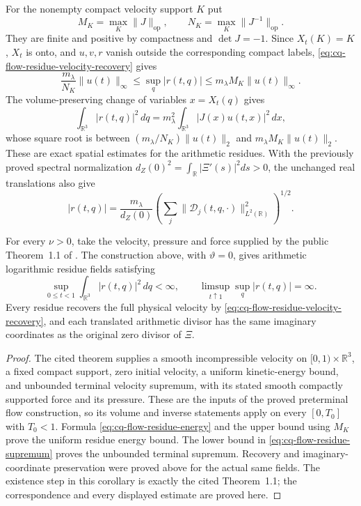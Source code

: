 For the nonempty compact velocity support $K$ put
\[
 M_K=\max_K\|J\|_{\mathrm{op}},\qquad
 N_K=\max_K\|J^{-1}\|_{\mathrm{op}}.
\]
They are finite and positive by compactness and $\det J=-1$.
Since $X_t(K)=K$, $X_t$ is onto, and $u,v,r$ vanish outside
the corresponding compact labels, \eqref{eq:cq-flow-residue-velocity-recovery}
gives
\begin{equation}
 \frac{m_\lambda}{N_K}\|u(t)\|_\infty
 \leq\sup_q|r(t,q)|
 \leq m_\lambda M_K\|u(t)\|_\infty .
 \label{eq:cq-flow-residue-supremum}
\end{equation}
The volume-preserving change of variables $x=X_t(q)$ gives
\begin{equation}
 \int_{\mathbb R^3}|r(t,q)|^2\,dq
 =m_\lambda^2\int_{\mathbb R^3}|J(x)u(t,x)|^2\,dx,
 \label{eq:cq-flow-residue-energy}
\end{equation}
whose square root is between
$(m_\lambda/N_K)\|u(t)\|_2$ and
$m_\lambda M_K\|u(t)\|_2$.
These are exact spatial estimates for the arithmetic residues.
With the previously proved spectral normalization
$d_Z(0)^2=\int_{\mathbb R}|\Xi'(s)|^2ds>0$, the unchanged
real translations also give
\[
 |r(t,q)|
 =\frac{m_\lambda}{d_Z(0)}
       \left(\sum_j\|\mathcal D_j(t,q,\cdot)\|_{L^2(\mathbb R)}^2
       \right)^{1/2}.
\]

\begin{cqproposition}
For every $\nu>0$, take the velocity, pressure and force supplied by
the public Theorem~1.1 of \cite{cqNS2026}. The construction above,
with $\vartheta=0$, gives arithmetic logarithmic residue fields
satisfying
\[
 \sup_{0\leq t<1}\int_{\mathbb R^3}|r(t,q)|^2\,dq<\infty,
 \qquad
 \limsup_{t\uparrow1}\sup_q|r(t,q)|=\infty .
\]
Every residue recovers the full physical velocity by
\eqref{eq:cq-flow-residue-velocity-recovery}, and each translated
arithmetic divisor has the same imaginary coordinates as the
original zero divisor of $\Xi$.
\end{cqproposition}
\begin{proof}
The cited theorem supplies a smooth incompressible velocity on
$[0,1)\times\mathbb R^3$, a fixed compact support, zero initial
velocity, a uniform kinetic-energy bound, and unbounded terminal
velocity supremum, with its stated smooth compactly supported force
and its pressure. These are the inputs of the proved preterminal
flow construction, so its volume and inverse statements apply
on every $[0,T_0]$ with $T_0<1$. Formula
\eqref{eq:cq-flow-residue-energy} and the upper bound using $M_K$
prove the uniform residue energy bound. The lower bound in
\eqref{eq:cq-flow-residue-supremum} proves the unbounded terminal
supremum. Recovery and imaginary-coordinate preservation were
proved above for the actual same fields. The existence step in
this corollary is exactly the cited Theorem~1.1; the correspondence
and every displayed estimate are proved here.
\end{proof}

